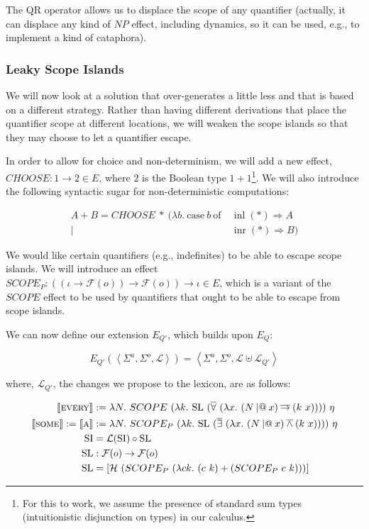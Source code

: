 The QR operator allows us to displace the scope of any quantifier
(actually, it can displace any kind of $NP$ effect, including dynamics, so
it can be used, e.g., to implement a kind of cataphora).

\subsubsection{Leaky Scope Islands}

We will now look at a solution that over-generates a little less and that
is based on a different strategy. Rather than having different derivations
that place the quantifier scope at different locations, we will weaken the
scope islands so that they may choose to let a quantifier escape.

In order to allow for choice and non-determinism, we will add a new effect,
$CHOOSE : 1 \to 2 \in E$, where $2$ is the Boolean type $1 +
1$\footnote{For this to work, we assume the presence of standard sum types
  (intuitionistic disjunction on types) in our calculus.}. We will also
introduce the following syntactic sugar for non-deterministic computations:

\begin{align*}
A + B = CHOOSE\ *\ (\lambda b.\ \text{case}\ b\ \text{of}\ &\operatorname{inl}(*) \Rightarrow A \\
|\ &\operatorname{inr}(*) \Rightarrow B)
\end{align*}

We would like certain quantifiers (e.g., indefinites) to be able to escape
scope islands. We will introduce an effect $SCOPE_P : ((\iota \to
\mathcal{F}(o)) \to \mathcal{F}(o)) \to \iota \in E$, which is a variant of
the $SCOPE$ effect to be used by quantifiers that ought to be able to
escape from scope islands.

We can now define our extension $E_{Q'}$, which builds upon $E_Q$:

$$
E_{Q'}(\left< \Sigma^a, \Sigma^o, \mathcal{L} \right>) =
\left< \Sigma^a, \Sigma^o, \mathcal{L} \uplus \mathcal{L}_{Q'} \right>
$$

where, $\mathcal{L}_{Q'}$, the changes we propose to the lexicon, are as
follows:

\begin{align*}
  \lex{every}{\lambda N.\ SCOPE\ (\lambda k.\ \mathrm{SL}\ (\dforall\ (\lambda x.\ (N \apl x) \dimpl (k\ x))))}\ \eta \\
  \sem{\abs{some}} := \sem{\abs{a}} &:= \lambda N.\ SCOPE_P\ (\lambda k.\ \mathrm{SL}\ (\dexists\ (\lambda x.\ (N \apl x) \dand (k\ x))))\ \eta \\
  \mathrm{SI} &= \mathcal{L}(\mathrm{SI}) \circ \mathrm{SL} \\
  \mathrm{SL} &: \mathcal{F}(o) \to \mathcal{F}(o) \\
  \mathrm{SL} &= [\mathcal{H}\ (SCOPE_P\ (\lambda c k.\ (c\ k) + (SCOPE_P\ c\ k)))] 
\end{align*}

